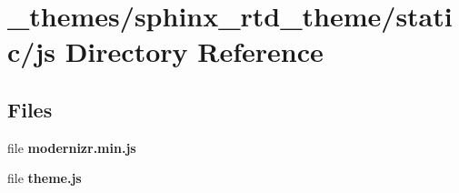 \section{\-\_\-themes/sphinx\-\_\-rtd\-\_\-theme/static/js Directory Reference}
\label{dir_4ce7b78966e813eef96407188fe15631}
\subsection*{Files}
\begin{DoxyCompactItemize}
\item 
file {\bfseries modernizr.\-min.\-js}
\item 
file {\bfseries theme.\-js}
\end{DoxyCompactItemize}
